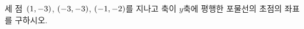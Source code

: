 세 점~$(1{,}\mkern3mu\mathopen{}-3)$, $(-3{,}\mkern3mu\mathopen{}-3)$, $(-1{,}\mkern3mu\mathopen{}-2)$를 지나고 축이 $y$축에 평행한 포물선의 초점의 좌표를 구하시오.
